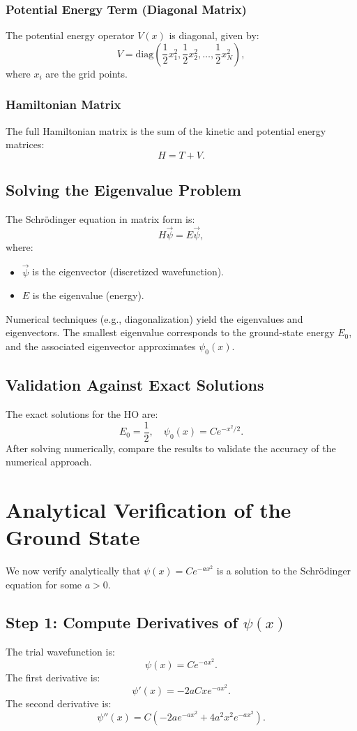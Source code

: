 \documentclass[a4paper,12pt]{article}
\begin{document}
\begin{multicols}{2}
\subsubsection*{Potential Energy Term (Diagonal Matrix)}
The potential energy operator \( V(x) \) is diagonal, given by:
\[
V = \text{diag}\left(\frac{1}{2}x_1^2, \frac{1}{2}x_2^2, \ldots, \frac{1}{2}x_N^2\right),
\]
where \( x_i \) are the grid points.

\subsubsection*{Hamiltonian Matrix}
The full Hamiltonian matrix is the sum of the kinetic and potential energy matrices:
\[
H = T + V.
\]

\subsection*{Solving the Eigenvalue Problem}
The Schrödinger equation in matrix form is:
\[
H \vec{\psi} = E \vec{\psi},
\]
where:
\begin{itemize}
    \item \( \vec{\psi} \) is the eigenvector (discretized wavefunction).
    \item \( E \) is the eigenvalue (energy).
\end{itemize}
Numerical techniques (e.g., diagonalization) yield the eigenvalues and eigenvectors. The smallest eigenvalue corresponds to the ground-state energy \( E_0 \), and the associated eigenvector approximates \( \psi_0(x) \).

\subsection*{Validation Against Exact Solutions}
The exact solutions for the HO are:
\[
E_0 = \frac{1}{2}, \quad \psi_0(x) = Ce^{-x^2/2}.
\]
After solving numerically, compare the results to validate the accuracy of the numerical approach.

\section{Analytical Verification of the Ground State}
We now verify analytically that \( \psi(x) = Ce^{-ax^2} \) is a solution to the Schrödinger equation for some \( a > 0 \).

\subsection*{Step 1: Compute Derivatives of \( \psi(x) \)}
The trial wavefunction is:
\[
\psi(x) = Ce^{-ax^2}.
\]
The first derivative is:
\[
\psi'(x) = -2aCx e^{-ax^2}.
\]
The second derivative is:
\[
\psi''(x) = C\left(-2ae^{-ax^2} + 4a^2x^2e^{-ax^2}\right).
\]


\end{multicols}
\end{document}
